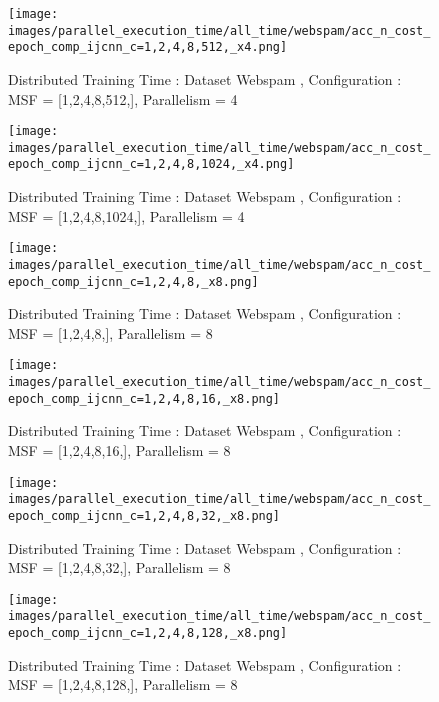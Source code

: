 \begin{figure*}[htbp]
\centering
\texttt{[image: images/parallel\_execution\_time/all\_time/webspam/acc\_n\_cost\_epoch\_comp\_ijcnn\_c=1,2,4,8,512,\_x4.png]}
\caption{Distributed Training Time : Dataset Webspam , Configuration : MSF = [1,2,4,8,512,], Parallelism = 4}
\label{fig:dis-msf-tr-time-webspam-x4}
\end{figure*}


\begin{figure*}[htbp]
\centering
\texttt{[image: images/parallel\_execution\_time/all\_time/webspam/acc\_n\_cost\_epoch\_comp\_ijcnn\_c=1,2,4,8,1024,\_x4.png]}
\caption{Distributed Training Time : Dataset Webspam , Configuration : MSF = [1,2,4,8,1024,], Parallelism = 4}
\label{fig:dis-msf-tr-time-webspam-x4}
\end{figure*}


\begin{figure*}[htbp]
\centering
\texttt{[image: images/parallel\_execution\_time/all\_time/webspam/acc\_n\_cost\_epoch\_comp\_ijcnn\_c=1,2,4,8,\_x8.png]}
\caption{Distributed Training Time : Dataset Webspam , Configuration : MSF = [1,2,4,8,], Parallelism = 8}
\label{fig:dis-msf-tr-time-webspam-x8}
\end{figure*}


\begin{figure*}[htbp]
\centering
\texttt{[image: images/parallel\_execution\_time/all\_time/webspam/acc\_n\_cost\_epoch\_comp\_ijcnn\_c=1,2,4,8,16,\_x8.png]}
\caption{Distributed Training Time : Dataset Webspam , Configuration : MSF = [1,2,4,8,16,], Parallelism = 8}
\label{fig:dis-msf-tr-time-webspam-x8}
\end{figure*}


\begin{figure*}[htbp]
\centering
\texttt{[image: images/parallel\_execution\_time/all\_time/webspam/acc\_n\_cost\_epoch\_comp\_ijcnn\_c=1,2,4,8,32,\_x8.png]}
\caption{Distributed Training Time : Dataset Webspam , Configuration : MSF = [1,2,4,8,32,], Parallelism = 8}
\label{fig:dis-msf-tr-time-webspam-x8}
\end{figure*}


\begin{figure*}[htbp]
\centering
\texttt{[image: images/parallel\_execution\_time/all\_time/webspam/acc\_n\_cost\_epoch\_comp\_ijcnn\_c=1,2,4,8,128,\_x8.png]}
\caption{Distributed Training Time : Dataset Webspam , Configuration : MSF = [1,2,4,8,128,], Parallelism = 8}
\label{fig:dis-msf-tr-time-webspam-x8}
\end{figure*}


